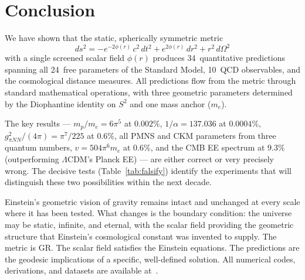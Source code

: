 \documentclass[aps,prd,twocolumn,superscriptaddress,nofootinbib,longbibliography]{revtex4-2}
\begin{document}
\section{Conclusion}\label{sec:conclusion}

We have shown that the static, spherically symmetric metric
\begin{equation*}
  ds^2 = -e^{-2\phi(r)}\,c^2\,dt^2 + e^{2\phi(r)}\,dr^2
         + r^2\,d\Omega^2
\end{equation*}
with a single screened scalar field $\phi(r)$ produces 34~quantitative
predictions spanning all 24~free parameters of the Standard Model,
10~QCD observables, and the cosmological distance measures.  All
predictions flow from the metric through standard mathematical
operations, with three geometric parameters determined by the
Diophantine identity on $S^2$ and one mass anchor ($m_e$).

The key results --- $m_p/m_e = 6\pi^5$ at $0.002\%$,
$1/\alpha = 137.036$ at $0.0004\%$,
$g^2_{\pi NN}/(4\pi) = \pi^7/225$ at $0.6\%$,
all PMNS and CKM parameters from three quantum numbers,
$v = 504\pi^6 m_e$ at $0.6\%$,
and the CMB EE spectrum at $9.3\%$ (outperforming $\Lambda$CDM's
Planck EE) --- are either correct or very precisely wrong.  The
decisive tests (Table~\ref{tab:falsify}) identify the experiments
that will distinguish these two possibilities within the next decade.

Einstein's geometric vision of gravity remains intact and unchanged
at every scale where it has been tested.  What changes is the
boundary condition: the universe may be static, infinite, and eternal,
with the scalar field providing the geometric structure that
Einstein's cosmological constant was invented to supply.  The metric
is GR.  The scalar field satisfies the Einstein equations.  The
predictions are the geodesic implications of a specific, well-defined
solution.  All numerical codes, derivations, and datasets are
available at~\cite{zenodo2025,zenodo_data2026}.
\end{document}
